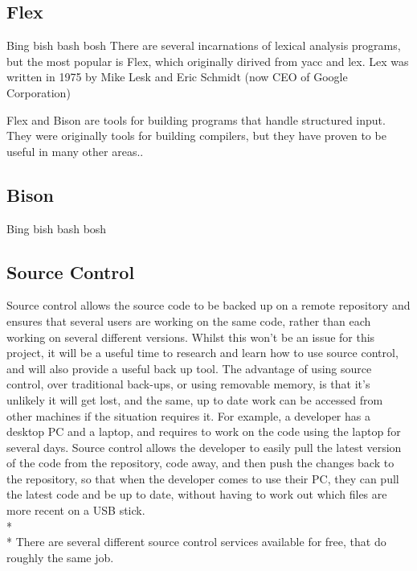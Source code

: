 \documentclass[12pt]{report}
\begin{document}
\subsection{Flex}\label{subsec:flex}
Bing bish bash bosh
There are several incarnations of lexical analysis programs, but the most popular is Flex, which originally dirived from yacc and lex.  Lex was written in 1975 by Mike Lesk and Eric Schmidt (now CEO of Google Corporation)

Flex and Bison are tools for building programs that handle structured input.  They were originally tools for building compilers, but they have proven to be useful in many other areas.\citep{flexandbison09}.
\subsection{Bison}\label{subsec:bison}
Bing bish bash bosh
\subsection{Source Control}\label{subsec:dev_source_control}
Source control allows the source code to be backed up on a remote repository and ensures that several users are working on the same code, rather than each working on several different versions.  Whilst this won't be an issue for this project, it will be a useful time to research and learn how to use source control, and will also provide a useful back up tool.  The advantage of using source control, over traditional back-ups, or using removable memory, is that it's unlikely it will get lost, and the same, up to date work can be accessed from other machines if the situation requires it.  For example, a developer has a desktop PC and a laptop, and requires to work on the code using the laptop for several days.  Source control allows the developer to easily pull the latest version of the code from the repository, code away, and then push the changes back to the repository, so that when the developer comes to use their PC, they can pull the latest code and be up to date, without having to work out which files are more recent on a USB stick.
\\*
\\*
There are several different source control services available for free, that do roughly the same job.
\end{document}
